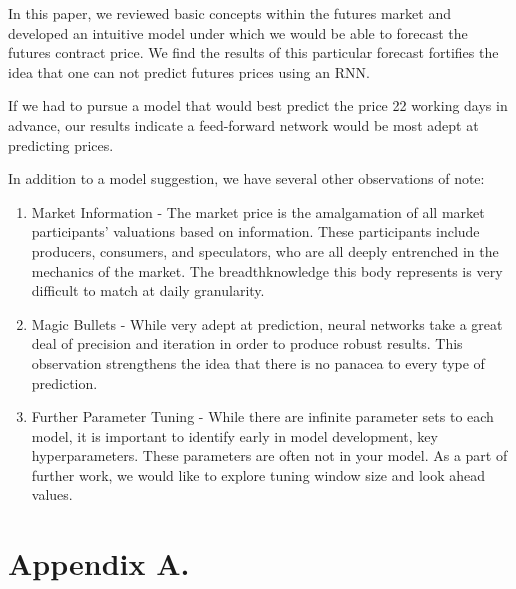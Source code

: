 \documentclass[twoside,11pt]{article}
\begin{document}
In this paper, we reviewed basic concepts within the futures market and developed an intuitive model under which we would be able to forecast the futures contract price. We find the results of this particular forecast fortifies the idea that one can not predict futures prices using an RNN. 

If we had to pursue a model that would best predict the price 22 working days in advance, our results indicate a feed-forward network would be most adept at predicting prices. 

In addition to a model suggestion, we have several other observations of note:

\begin{enumerate}
	\item Market Information - The market price is the amalgamation of all market participants' valuations based on information. These participants include producers, consumers, and speculators, who are all deeply entrenched in the mechanics of the market. The breadthknowledge this body represents is very difficult to match at daily granularity.
	\item Magic Bullets - While very adept at prediction, neural networks take a great deal of precision and iteration in order to produce robust results. This observation strengthens the idea that there is no panacea to every type of prediction.
	\item Further Parameter Tuning - While there are infinite parameter sets to each model, it is important to identify early in model development, key hyperparameters. These parameters are often not in your model.  As a part of further work, we would like to explore tuning window size and look ahead values. 
\end{enumerate}




\appendix
\section*{Appendix A.}\label{append}
\end{document}
